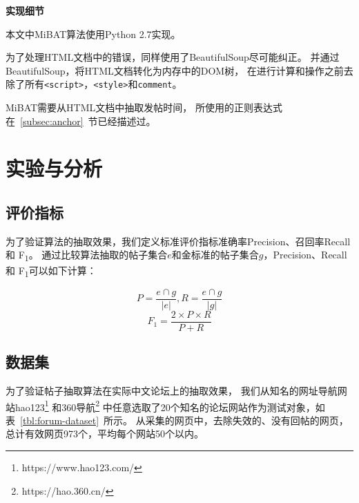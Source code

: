 \textbf{实现细节}

本文中MiBAT算法使用Python 2.7实现。

为了处理HTML文档中的错误，同样使用了BeautifulSoup尽可能纠正。
并通过BeautifulSoup，将HTML文档转化为内存中的DOM树，
在进行计算和操作之前去除了所有\texttt{<script>}，\texttt{<style>}和\texttt{comment}。

MiBAT需要从HTML文档中抽取发帖时间，
所使用的正则表达式在~\ref{subsec:anchor}~节已经描述过。

\section{实验与分析}
\label{sec:pean-experiment}

\subsection{评价指标}
为了验证算法的抽取效果，我们定义标准评价指标准确率Precision、召回率Recall和
F\textsubscript{1}。
通过比较算法抽取的帖子集合$e$和金标准的帖子集合$g$，Precision、Recall和
F\textsubscript{1}可以如下计算：

\begin{equation}
P = \frac{e \cap g}{\vert e \vert}, R = \frac{e \cap g}{\vert g \vert}
\end{equation}
\begin{equation}
F_1 = \frac{2 \times P \times R}{P + R}
\end{equation}

\subsection{数据集}
为了验证帖子抽取算法在实际中文论坛上的抽取效果，
我们从知名的网址导航网站hao123\footnote{https://www.hao123.com/}
和360导航\footnote{https://hao.360.cn/}
中任意选取了20个知名的论坛网站作为测试对象，如表~\ref{tbl:forum-dataset}~所示。
从采集的网页中，去除失效的、没有回帖的网页，
总计有效网页973个，平均每个网站50个以内。

